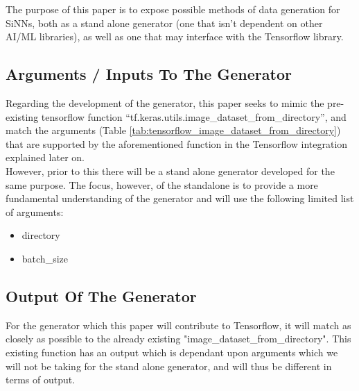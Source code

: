 \documentclass[
	letterpaper, %
	10pt, %
	unnumberedsections, %
	twoside, %
]{LTJournalArticle}
\begin{document}
The purpose of this paper is to expose possible methods of data generation for SiNNs, both as a stand alone generator (one that isn't dependent on other AI/ML libraries), as well as one that may interface with the Tensorflow library.

\subsection{Arguments / Inputs To The Generator}
Regarding the development of the generator, this paper seeks to mimic the pre-existing tensorflow function “tf.keras.utils.image\_dataset\_from\_directory”, and match the arguments (Table \ref{tab:tensorflow_image_dataset_from_directory}) that are supported by the aforementioned function\autocite{image_dataset_from_directory} in the Tensorflow integration explained later on. \\
However, prior to this there will be a stand alone generator developed for the same purpose. The focus, however, of the standalone is to provide a more fundamental understanding of the generator and will use the following limited list of arguments:
\begin{itemize}[noitemsep,topsep=-8pt]
	\item directory
	\item batch\_size
\end{itemize}


%

\subsection{Output Of The Generator}

For the generator which this paper will contribute to Tensorflow, it will match as closely as possible to the already existing "image\_dataset\_from\_directory". This existing function has an output which is dependant upon arguments which we will not be taking for the stand alone generator, and will thus be different in terms of output.
\end{document}
